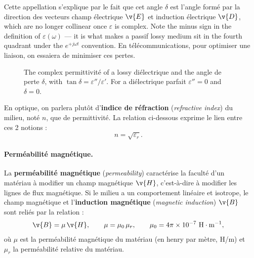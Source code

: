 Cette appellation s'explique par le fait que cet angle $\delta$ est l'angle
formé par la direction des vecteurs champ électrique $\v{E}$ et induction
électrique $\v{D}$, which are no longer collinear once $\varepsilon$ is complex.
Note the minus sign in the definition of $\varepsilon(\omega)$ --- it is what
makes a passif lossy medium sit in the fourth quadrant under the
$e^{+j\omega t}$ convention. En télécommunications, pour optimiser une liaison,
on essaiera de minimiser ces pertes.

\begin{figure}[h!]
  \centering
  \caption*{\small The complex permittivité of a lossy diélectrique and the angle
  de perte $\delta$, with $\tan\delta = \varepsilon''/\varepsilon'$. For a
  diélectrique parfait $\varepsilon'' = 0$ and $\delta = 0$.}
\end{figure}

\begin{remark}
  En optique, on parlera plutôt d'\textbf{indice de réfraction}
  (\textit{refractive index}) du milieu, noté $n$, que de permittivité. La
  relation ci-dessous exprime le lien entre ces 2 notions :
  \[ n = \sqrt{\varepsilon_r}. \]
\end{remark}

\paragraph{Perméabilité magnétique.}
La \textbf{perméabilité magnétique} (\textit{permeability}) caractérise la
faculté d'un matériau à modifier un champ magnétique $\v{H}$, c'est-à-dire à
modifier les lignes de flux magnétique. Si le milieu a un comportement linéaire
et isotrope, le champ magnétique et l'\textbf{induction magnétique}
(\textit{magnetic induction}) $\v{B}$ sont reliés par la relation :
\[
  \v{B} = \mu\,\v{H},
  \qquad
  \mu = \mu_0\,\mu_r,
  \qquad
  \mu_0 = 4\pi\times 10^{-7}\ \text{H}\cdot\text{m}^{-1},
\]
où $\mu$ est la perméabilité magnétique du matériau (en henry par mètre, H/m)
et $\mu_r$ la perméabilité relative du matériau.

